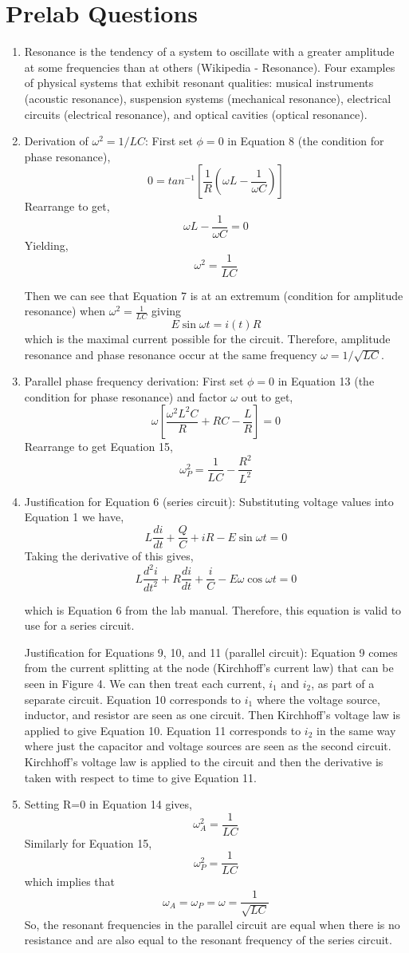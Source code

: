 \section{Prelab Questions}
\begin{enumerate}
\item Resonance is the tendency of a system to oscillate with a greater amplitude at some frequencies than at others (Wikipedia - Resonance). Four examples of physical systems that exhibit resonant qualities: musical instruments (acoustic resonance), suspension systems (mechanical resonance), electrical circuits (electrical resonance), and optical cavities (optical resonance).
\item Derivation of $\omega^2 = 1/LC$: First set $\phi=0$ in Equation 8 (the condition for phase resonance),
$$
0=tan^{-1}\left[ \frac{1}{R} \left( \omega L - \frac{1}{\omega C} \right) \right]
$$
Rearrange to get,
$$
\omega L - \frac{1}{\omega C} =0
$$
Yielding,
$$
\omega^2 = \frac{1}{LC}
$$

Then we can see that Equation 7 is at an extremum (condition for amplitude resonance) when $\omega^2 = \frac{1}{LC}$ giving
$$
E\sin\omega t = i(t)R
$$
which is the maximal current possible for the circuit. Therefore, amplitude resonance and phase resonance occur at the same frequency $\omega=1/\sqrt{LC}$.
\item Parallel phase frequency derivation: First set $\phi=0$ in Equation 13 (the condition for phase resonance) and factor $\omega$ out to get,
$$
\omega\left[\frac{\omega^2L^2C}{R}+RC-\frac{L}{R}\right]=0
$$
Rearrange to get Equation 15,
$$
\omega_P^2 = \frac{1}{LC} -\frac{R^2}{L^2}
$$
\item Justification for Equation 6 (series circuit): Substituting voltage values into Equation 1 we have,
$$
L\frac{di}{dt}+\frac{Q}{C}+iR-E\sin\omega t = 0
$$
Taking the derivative of this gives,
$$
L\frac{d^2i}{dt^2} + R\frac{di}{dt} + \frac{i}{C} - E\omega\cos\omega t = 0
$$

which is Equation 6 from the lab manual. Therefore, this equation is valid to use for a series circuit.

Justification for Equations 9, 10, and 11 (parallel circuit): Equation 9 comes from the current splitting at the node (Kirchhoff's current law) that can be seen in Figure 4. We can then treat each current, $i_1$ and $i_2$, as part of a separate circuit. Equation 10 corresponds to $i_1$ where the voltage source, inductor, and resistor are seen as one circuit. Then Kirchhoff's voltage law is applied to give Equation 10. Equation 11 corresponds to $i_2$ in the same way where just the capacitor and voltage sources are seen as the second circuit. Kirchhoff's voltage law is applied to the circuit and then the derivative is taken with respect to time to give Equation 11.
\item Setting R=0 in Equation 14 gives,
$$
\omega_A ^2 = \frac{1}{LC}
$$
Similarly for Equation 15,
$$
\omega_P ^2 = \frac{1}{LC}
$$
which implies that 
$$
\omega_A=\omega_P=\omega=\frac{1}{\sqrt{LC}}
$$
So, the resonant frequencies in the parallel circuit are equal when there is no resistance and are also equal to the resonant frequency of the series circuit.
\end{enumerate}


